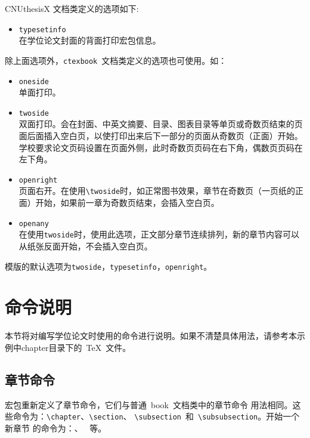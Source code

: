 CNUthesisX 文档类定义的选项如下:
\begin{itemize}
\item \verb|typesetinfo|\\
	在学位论文封面的背面打印宏包信息。
\end{itemize}

除上面选项外，\texttt{ctexbook}~文档类定义的选项也可使用。如：
\begin{itemize}
\item \verb|oneside|\\
	单面打印。
\item \verb|twoside|\\
	双面打印。会在封面、中英文摘要、目录、图表目录等单页或奇数页结束的页面后面插入空白页，以使打印出来后下一部分的页面从奇数页（正面）开始。
	学校要求论文页码设置在页面外侧，此时奇数页页码在右下角，偶数页页码在左下角。
\item \verb|openright|\\
	页面右开。在使用\verb|\twoside|时，如正常图书效果，章节在奇数页（一页纸的正面）开始，如果前一章为奇数页结束，会插入空白页。
	\item \verb|openany|\\
	在使用\verb|twoside|时，使用此选项，正文部分章节连续排列，新的章节内容可以从纸张反面开始，不会插入空白页。
\end{itemize}

模版的默认选项为\verb|twoside|，\verb|typesetinfo|，\verb|openright|。
\section{命令说明}

本节将对编写学位论文时使用的命令进行说明。如果不清楚具体用法，请参考本示例中chapter目录下的~\TeX~文件。

\subsection{章节命令}

宏包重新定义了章节命令，它们与普通~book~文档类中的章节命令
用法相同。这些命令为：\verb|\chapter|、\verb|\section|、%
\verb|\subsection|~和~\verb|\subsubsection|。开始一个新章节
的命令为：、%
~等。

